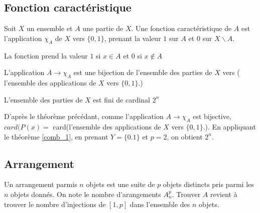 \documentclass[french]{yLectureNote}
\begin{document}
\subsection{Fonction caractéristique}
\begin{theorem}
Soit $X$ un ensemble et $A$ une partie de $X$. Une fonction caractéristique de $A$ est l'application $\chi_A$ de $X$ vers $\{0,1\}$, prenant la valeur $1$ sur $A$ et $0$ sur $X\backslash A$.
\end{theorem}
La fonction prend la valeur $1$ si $x \in A$ et $0$ si $x\notin A$
\begin{theorem}[]
L'application  $A\to \chi_A$ est une bijection de l'ensemble des parties de $X$ vers ( l'ensemble des applications de $X$ vers $\{0,1\}$.)
\end{theorem}
\begin{theorem}[]
L'ensemble des parties de $X$ est fini de cardinal $2^n$
\end{theorem}
\begin{myproof}
D'après le théorème précédant, comme l'application $A\to \chi_A$ est bijective, $card(P(x) = $ card(l'ensemble des applications de $X$ vers $\{0,1\}$.).
En appliquant le théorème \ref{comb_1},
en prenant $Y = \{0.1\}$ et $p = 2$, on obtient $2^n$.
\end{myproof}
\subsection{Arrangement}
Un arrangement parmis $n$ objets est une suite de $p$ objets distincts pris parmi les $n$ objets donnés. On note le nombre d'arangements $A^p_n$. Trouver $A$ revient à trouver le nombre d'injections de $[1,p]$ dans l'ensemble des $n$ objets.
\end{document}

